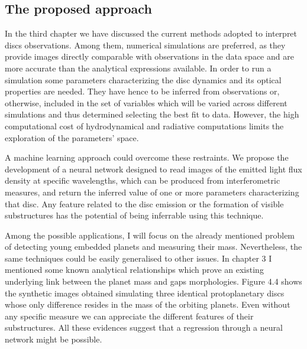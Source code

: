 \documentclass[a4paper,10pt]{report}
\begin{document}
\subsection{The proposed approach}

In the third chapter we have discussed the current methods adopted to interpret discs observations.
Among them, numerical simulations are preferred, as they provide images
directly comparable with observations in the data space and are more accurate than the analytical expressions available.
In order to run a simulation some parameters characterizing the disc dynamics and its optical properties are needed.
They have hence to be inferred from observations or, otherwise, included in the set of variables which will be varied across different simulations
and thus determined selecting the best fit to data. However, the high computational cost of hydrodynamical and radiative 
computations limits the exploration of the parameters' space.

A machine learning approach could overcome these restraints. We propose the development
of a neural network designed to read images of the emitted light flux density at specific wavelengths,
which can be produced from interferometric measures, and return the inferred value of one or more 
parameters characterizing that disc. Any feature related to the disc emission or the formation of visible substructures 
has the potential of being inferrable using this technique.

Among the possible applications, I will focus on the already mentioned problem of detecting young embedded planets and measuring their mass.
Nevertheless, the same techniques could be easily generalised to other issues.
In chapter 3 I mentioned some known analytical relationships which prove an existing underlying link
between the planet mass and gaps morphologies. Figure 4.4 shows the synthetic images obtained simulating
three identical protoplanetary discs whose only difference resides in the mass of the orbiting planets. 
Even without any specific measure we can appreciate the different features of their substructures.
All these evidences suggest that a regression through a neural network might be possible.
\end{document}
